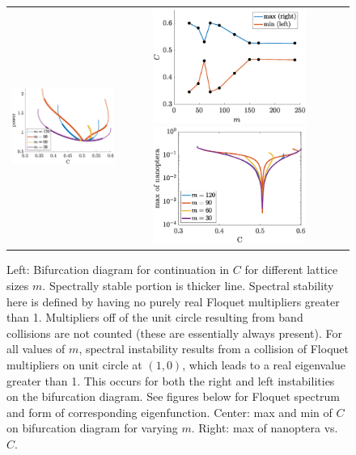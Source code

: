 \documentclass{article}
\begin{document}
\begin{figure}[H]
    \centering
    \begin{tabular}{ccc}
    \includegraphics[width=5cm]{rightBD1} &
    \includegraphics[width=5cm]{rightmaxminC} 
    \includegraphics[width=5cm]{rightBDnanop} 
    \end{tabular}
    \caption{Left: Bifurcation diagram for continuation in $C$ for different lattice sizes $m$. Spectrally stable portion is thicker line. Spectral stability here is defined by having no purely real Floquet multipliers greater than 1. Multipliers off of the unit circle resulting from band collisions are not counted (these are essentially always present). For all values of $m$, spectral instability results from a collision of Floquet multipliers on unit circle at $(1,0)$, which leads to a real eigenvalue greater than 1. This occurs for both the right and left instabilities on the bifurcation diagram. See figures below for Floquet spectrum and form of corresponding eigenfunction.
    Center: max and min of $C$ on bifurcation diagram for varying $m$. 
    Right: max of nanoptera vs. $C$.}
    \label{fig:right2}
\end{figure}
\end{document}
